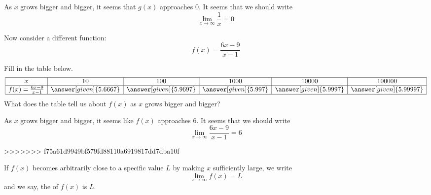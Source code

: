 \documentclass{ximera}
\begin{document}
\begin{example}
\begin{example}
\begin{explanation}
As $x$ grows bigger and bigger, it seems that $g(x)$ approaches $0$. It seems that we should write
\[
 \lim_{x\to \infty}\frac{1}{x}=0 
 \]
  \end{explanation}
\end{example}

\begin{example}
  Now consider a different function:
  \[
  f(x) = \frac{6x-9}{x-1}
  \]
  \begin{image}
  \end{image}
  Fill in the table below.
  \[
  \begin{array}{|c|c|c|c|c|c|}
    \hline
  x & 10 & 100 & 1000 &10000 & 100000 \\
  \hline
  f(x)=\frac{6x-9}{x-1} & \answer[given]{5.6667} & \answer[given]{5.9697} & \answer[given]{5.997} & \answer[given]{5.9997} & \answer[given]{5.99997}  \\
\hline
\end{array}
  \]
  What does the table tell us about $f(x)$ as $x$ grows bigger and bigger?
  \begin{explanation}
    As $x$ grows bigger and bigger, it seems like $f(x)$ approaches $6$.
    It seems that we should write
    \[
    \lim_{x\to \infty}\frac{6x-9}{x-1}=6 
    \]
  \end{explanation}
>>>>>>> f75a61d9949bf579fd88110a6919817dd7dba10f
\end{example}

\begin{definition}\label{def:limitAtInfty}
If $f(x)$ becomes arbitrarily close to a specific value $L$ by making
$x$ sufficiently large, we write
\[
\lim_{x\to \infty} f(x) = L
\]
and we say, the  of $f(x)$ is $L$.  


\end{definition}
\end{example}
\end{document}
